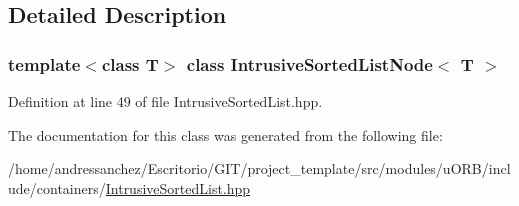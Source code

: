 \subsection{Detailed Description}
\subsubsection*{template$<$class T$>$\newline
class Intrusive\+Sorted\+List\+Node$<$ T $>$}



Definition at line 49 of file Intrusive\+Sorted\+List.\+hpp.



The documentation for this class was generated from the following file\+:\begin{DoxyCompactItemize}
\item 
/home/andressanchez/\+Escritorio/\+G\+I\+T/project\+\_\+template/src/modules/u\+O\+R\+B/include/containers/\hyperlink{IntrusiveSortedList_8hpp}{Intrusive\+Sorted\+List.\+hpp}\end{DoxyCompactItemize}
